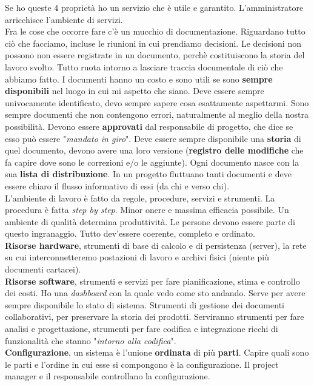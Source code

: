 Se ho queste 4 proprietà ho un servizio che è utile e garantito. L'amministratore arricchisce l'ambiente di servizi.\\ Fra le cose che occorre fare c'è un mucchio di documentazione. Riguardano tutto ciò che facciamo, incluse le riunioni in cui prendiamo decisioni. Le decisioni non possono non essere registrate in un documento, perchè costituiscono la storia del lavoro svolto. Tutto ruota intorno a lasciare traccia documentale di ciò che abbiamo fatto. I documenti hanno un costo e sono utili se sono \textbf{sempre disponibili} nel luogo in cui mi aspetto che siano. Deve essere sempre univocamente identificato, devo sempre sapere cosa esattamente aspettarmi. Sono sempre documenti che non contengono errori, naturalmente al meglio della nostra possibilità. Devono essere \textbf{approvati} dal responsabile di progetto, che dice se esso può essere "\textit{mandato in giro}". Deve essere sempre disponibile una \textbf{storia} di quel documento, devono avere una loro versione (\textbf{registro delle modifiche} che fa capire dove sono le correzioni e/o le aggiunte). Ogni documento nasce con la sua \textbf{lista di distribuzione}. In un progetto fluttuano tanti documenti e deve essere chiaro il flusso informativo di essi (da chi e verso chi).\\
L'ambiente di lavoro è fatto da regole, procedure, servizi e strumenti. La procedura è fatta \textit{step by step}. Minor onere e massima efficacia possibile. Un ambiente di qualità determina produttività. Le persone devono essere parte di questo ingranaggio. Tutto dev'essere coerente, completo e ordinato.\\
\textbf{Risorse hardware}, strumenti di base di calcolo e di persistenza (server), la rete su cui interconnetteremo postazioni di lavoro e archivi fisici (niente più documenti cartacei).\\
\textbf{Risorse software}, strumenti e servizi per fare pianificazione, stima e controllo dei costi. Ho una \textit{dashboard} con la quale vedo come sto andando. Serve per avere sempre disponibile lo stato di sistema. Strumenti di gestione dei documenti collaborativi, per preservare la storia dei prodotti. Serviranno strumenti per fare analisi e progettazione, strumenti per fare codifica e integrazione ricchi di funzionalità che stanno "\textit{intorno alla codifica}".\\
\textbf{Configurazione}, un sistema è l'unione \textbf{ordinata} di più \textbf{parti}. Capire quali sono le parti e l'ordine in cui esse si compongono è la configurazione. Il project manager e il responsabile controllano la configurazione.


